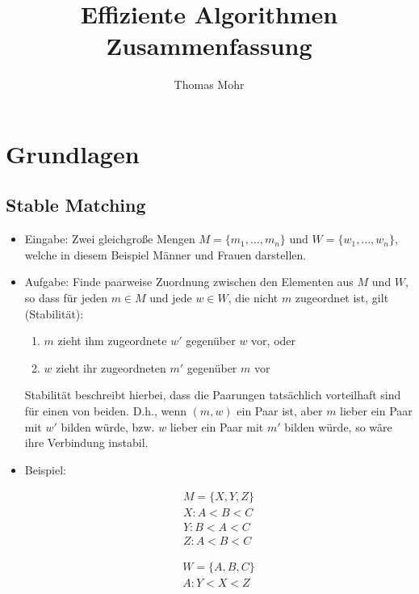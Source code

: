 \documentclass{scrartcl}
\title{Effiziente Algorithmen \\ Zusammenfassung}
\author{Thomas Mohr}
\date{}
\begin{document}
\maketitle
\pagebreak
\tableofcontents
\pagebreak
\listofalgorithms
\pagebreak

\section{Grundlagen}

\subsection{Stable Matching}

\begin{itemize}
	\item Eingabe: Zwei gleichgroße Mengen $ M = \{ m_1,\ldots,m_n \} $ und $ W = \{ w_1,\ldots,w_n \} $, welche in diesem Beispiel Männer und Frauen darstellen.
	\item Aufgabe: Finde paarweise Zuordnung zwischen den Elementen aus $ M $ und $ W $, so dass für jeden $ m \in M $ und jede $ w \in W $, die nicht $ m $ zugeordnet ist, gilt (Stabilität):
	\begin{enumerate}
		\item $ m $ zieht ihm zugeordnete $ w' $ gegenüber $ w $ vor, oder
		\item $ w $ zieht ihr zugeordneten $ m' $ gegenüber $ m $ vor
	\end{enumerate}
	Stabilität beschreibt hierbei, dass die Paarungen tatsächlich vorteilhaft sind für einen von beiden. D.h., wenn $ (m,w) $ ein Paar ist, aber $ m $ lieber ein Paar mit $ w' $ bilden würde, bzw. $ w $ lieber ein Paar mit $ m' $ bilden würde, so wäre ihre Verbindung instabil.
	\item Beispiel: \\
	\begin{minipage}{.5\linewidth}
		\begin{align*}
		M = \{ X,Y,Z \} \\
		X: A < B < C \\
		Y: B < A < C \\
		Z: A < B < C
		\end{align*}
	\end{minipage}
	\begin{minipage}{.5\linewidth}
		\begin{align*}
		W = \{ A,B,C \} \\
		A: Y < X < Z \\

\end{align*}
\end{minipage}
\end{itemize}
\end{document}
